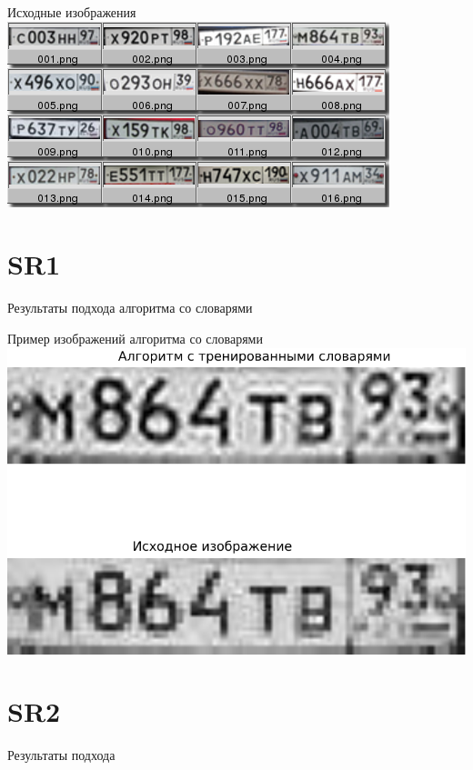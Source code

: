 \begin{frame}{Исходные изображения}
  \includegraphics[width=\columnwidth]{content/out_sr1.png}
\end{frame}

\section{SR1}
\begin{frame}{Результаты подхода алгоритма со словарями}
  
\end{frame}

\begin{frame}{Пример изображений алгоритма со словарями}
  \includegraphics[width=\columnwidth]{content/compare_result_sr1.pdf}
\end{frame}

\section{SR2}
\begin{frame}{Результаты подхода}
  
\end{frame}

